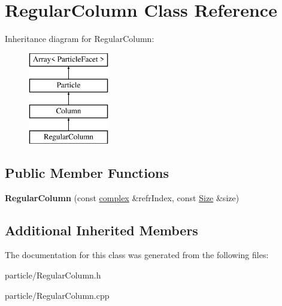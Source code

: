\hypertarget{class_regular_column}{}\section{Regular\+Column Class Reference}
\label{class_regular_column}
Inheritance diagram for Regular\+Column\+:\begin{figure}[H]
\begin{center}
\leavevmode
\includegraphics[height=4.000000cm]{class_regular_column}
\end{center}
\end{figure}
\subsection*{Public Member Functions}
\begin{DoxyCompactItemize}
\item 
\mbox{\label{class_regular_column_a812a5c38e59e8c467db27253cc993eff}} 
{\bfseries Regular\+Column} (const \mbox{\hyperlink{classcomplex}{complex}} \&refr\+Index, const \mbox{\hyperlink{struct_size}{Size}} \&size)
\end{DoxyCompactItemize}
\subsection*{Additional Inherited Members}


The documentation for this class was generated from the following files\+:\begin{DoxyCompactItemize}
\item 
particle/Regular\+Column.\+h\item 
particle/Regular\+Column.\+cpp\end{DoxyCompactItemize}
